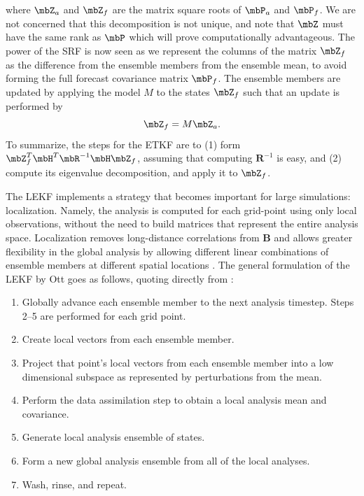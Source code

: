 where $\mbZ_a$ and $\mbZ_f$ are the matrix square roots of $\mbP_a$ and $\mbP_f$.
We are not concerned that this decomposition is not unique, and note that $\mbZ$ must have the same rank as $\mbP$ which will prove computationally advantageous.
The power of the SRF is now seen as we represent the columns of the matrix $\mbZ_f$ as the difference from the ensemble members from the ensemble mean, to avoid forming the full forecast covariance matrix $\mbP_f$.
The ensemble members are updated by applying the model $M$ to the states $\mbZ_f$ such that an update is performed by
\begin{equation} \mbZ_f = M \mbZ_a .\end{equation}
To summarize, the steps for the ETKF are to (1) form $\mbZ_f^T\mbH^T\mbR^{-1}\mbH\mbZ_f$, assuming that computing $\mathbf{R}^{-1}$ is easy, and (2) compute its eigenvalue decomposition, and apply it to $\mbZ_f$.

The LEKF implements a strategy that becomes important for large simulations: localization.
Namely, the analysis is computed for each grid-point using only local observations, without the need to build matrices that represent the entire analysis space.
Localization removes long-distance correlations from $\mathbf{B}$ and allows greater flexibility in the global analysis by allowing different linear combinations of ensemble members at different spatial locations \cite{kalnay2007a}.
The general formulation of the LEKF by Ott goes as follows, quoting directly from \cite{ott2004local}:
\begin{enumerate}
\item Globally advance each ensemble member to the next analysis timestep. Steps 2--5 are performed for each grid point.
\item Create local vectors from each ensemble member.
\item Project that point's local vectors from each ensemble member into a low dimensional subspace as represented by perturbations from the mean.
\item Perform the data assimilation step to obtain a local analysis mean and covariance.
\item Generate local analysis ensemble of states.
\item Form a new global analysis ensemble from all of the local analyses.
\item Wash, rinse, and repeat.
\end{enumerate}

